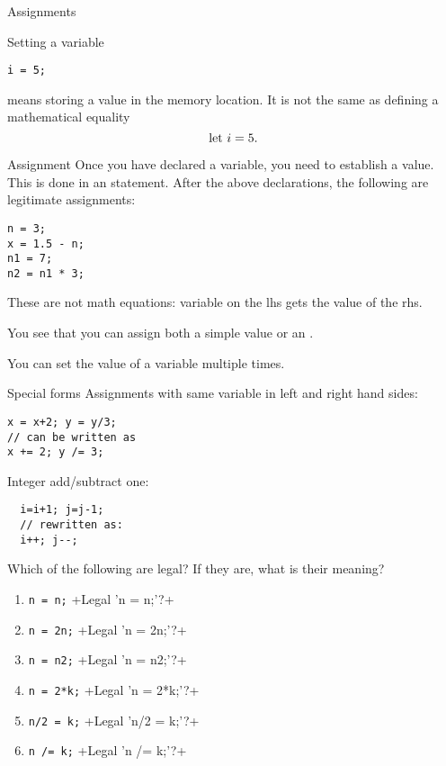  {Assignments}
\label{c:assign}

Setting a variable
\begin{lstlisting}
i = 5;
\end{lstlisting}
means storing a value in the memory location. It is
not the same as defining a mathematical equality
\[ \hbox{let $i=5$}. \]

\begin{block}{Assignment}
  \label{sl:assign1}
  Once you have declared a variable, you need to establish a value. This is done in an
   statement. After the above declarations, the
  following are legitimate assignments:
\begin{lstlisting}
n = 3;
x = 1.5 - n;
n1 = 7;
n2 = n1 * 3;
\end{lstlisting}
These are not math equations: variable on the lhs gets the value of
the rhs.

You see that you can assign both a simple value or an
.
\end{block}

You can set the value of a variable multiple times.

\begin{block}{Special forms}
  \label{sl:special-assign}
  Assignments with same variable in
  left and right hand sides:
\begin{lstlisting}
x = x+2; y = y/3;
// can be written as
x += 2; y /= 3;
\end{lstlisting}
Integer add/subtract one:
\begin{lstlisting}
  i=i+1; j=j-1;
  // rewritten as:
  i++; j--;
\end{lstlisting}
\end{block}

\begin{exercise}
  \label{q:assign}
  Which of the following are legal? If they are, what is their meaning?
  \begin{enumerate}
  \item \lstinline{n = n;}
    \slackpollTF+Legal 'n = n;'?+
  \item \lstinline{n = 2n;}
    \slackpollTF+Legal 'n = 2n;'?+
  \item \lstinline{n = n2;}
    \slackpollTF+Legal 'n = n2;'?+
  \item \lstinline{n = 2*k;}
    \slackpollTF+Legal 'n = 2*k;'?+
  \item \lstinline{n/2 = k;}
    \slackpollTF+Legal 'n/2 = k;'?+
  \item \lstinline{n /= k;}
    \slackpollTF+Legal 'n /= k;'?+
  \end{enumerate}
\end{exercise}

